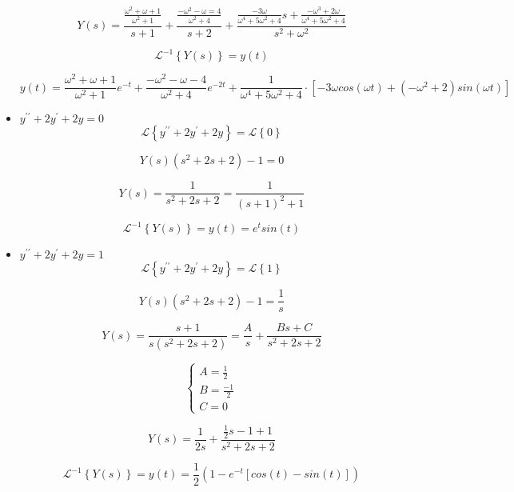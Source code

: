 \documentclass{article}
\begin{document}
\begin{itemize}
        $$Y(s)=\frac{\frac{\omega^{2}+\omega+1}{\omega^{2}+1}}{s+1}+
            \frac{\frac{-\omega^{2}-\omega=4}{\omega^{2}+4}}{s+2}+
            \frac{\frac{-3\omega}{\omega^{4}+5\omega^{2}+4}s+
            \frac{-\omega^{3}+2\omega}{\omega^{4}+5\omega^{2}+4}}{s^{2}+\omega^{2}}$$

        $$\mathcal{L}^{-1}\left\{Y(s)\right\}=y(t)$$

        $$y(t)= \frac{\omega^{2}+\omega+1}{\omega^{2}+1}e^{-t} +
            \frac{-\omega^{2}-\omega-4}{\omega^{2}+4}e^{-2t}+
            \frac{1}{\omega^{4}+5\omega^{2}+4}\cdot \left[-3\omega cos(\omega t)+
            (-\omega^{2}+2)sin(\omega t)\right]$$


    \item $y^{\prime \prime}+2y^{\prime}+2y=0$
        $$\mathcal{L}\left\{y^{\prime \prime}+2y^{\prime}+2y\right\}=\mathcal{L}\left\{0\right\}$$

        $$Y(s) \left(s^{2}+2s+2\right)-1=0$$

        $$Y(s)=\frac{1}{s^{2}+2s+2}=\frac{1}{(s+1)^{2}+1}$$

        $$\mathcal{L}^{-1}\left\{Y(s)\right\}=y(t)=e^{t}sin(t)$$

\newpage
    \item $y^{\prime \prime}+2y^{\prime}+2y=1$
        $$\mathcal{L}\left\{y^{\prime \prime}+2y^{\prime}+2y\right\}=\mathcal{L}\left\{1\right\}$$

        $$Y(s)\left(s^{2}+2s+2\right)-1=\frac{1}{s} $$

        $$Y(s)=\frac{s+1}{s\left(s^{2}+2s+2\right)} =\frac{A}{s}+\frac{Bs+C}{s^{2}+2s+2}$$

        \[\begin{cases}
            A=\frac{1}{2}
            \\
            B=\frac{-1}{2}
            \\
            C=0
        \end{cases}\]

        $$ Y(s)=\frac{1}{2s}+\frac{\frac{1}{2}s-1+1}{s^{2}+2s+2}$$

        $$\mathcal{L}^{-1}\left\{Y(s)\right\}=y(t)=\frac{1}{2}
            \left(1-e^{-t}\left[cos(t)-sin(t)\right]\right) $$


\end{itemize}
\end{document}
